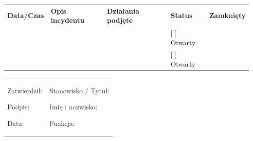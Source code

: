 \documentclass[12pt,a4paper]{article}
\begin{document}
\begin{longtable}[]{@{}>{\raggedright\arraybackslash}p{}>{\raggedright\arraybackslash}p{}>{\raggedright\arraybackslash}p{}>{\raggedright\arraybackslash}p{}>{\raggedright\arraybackslash}p{}@{}}
\toprule\noalign{}
Data/Czas & Opis incydentu & Działania podjęte & Status & Zamknięty \\
\midrule\noalign{}
\endhead
\bottomrule\noalign{}
\endlastfoot
\underline{\hspace{2cm}} &
\underline{\hspace{2cm}} &
\underline{\hspace{2cm}} & {[} {]} Otwarty &
\underline{\hspace{2cm}} \\
\underline{\hspace{2cm}} &
\underline{\hspace{2cm}} &
\underline{\hspace{2cm}} & {[} {]} Otwarty &
\underline{\hspace{2cm}} \\
\end{longtable}

\begin{longtable}[]{@{}
  >{\raggedright\arraybackslash}p{}
  >{\raggedright\arraybackslash}p{}@{}}
\toprule\noalign{}
\endhead
\bottomrule\noalign{}
\endlastfoot
\begin{minipage}[t]{\linewidth}\raggedright
Zatwierdził:

Podpis: \underline{\hspace{3cm}}

Data: \underline{\hspace{4cm}}
\end{minipage} & \begin{minipage}[t]{\linewidth}\raggedright
Stanowisko / Tytuł:

Imię i nazwisko: \underline{\hspace{3cm}}

Funkcja: \underline{\hspace{3cm}}
\end{minipage} \\
\end{longtable}
\end{document}

